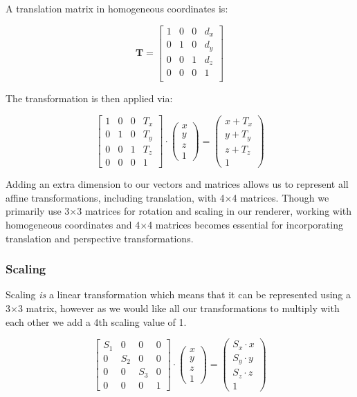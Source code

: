 \documentclass[12pt]{article}
\begin{document}
A translation matrix in homogeneous coordinates is:

\[
    \mathbf{T} = \begin{bmatrix}
        1 & 0 & 0 & d_x \\
        0 & 1 & 0 & d_y \\
        0 & 0 & 1 & d_z \\
        0 & 0 & 0 & 1   \\
    \end{bmatrix}
\]

The transformation is then applied via:

\[
    \begin{bmatrix}  1 & 0 & 0 & {T_x} \\ 0 & 1 & 0 & {T_y} \\ 0 & 0 & 1 & {T_z} \\ 0 & 0 & 0 & 1 \end{bmatrix} \cdot \begin{pmatrix} x \\ y \\ z \\ 1 \end{pmatrix} = \begin{pmatrix} x + {T_x} \\ y + {T_y} \\ z + {T_z} \\ 1 \end{pmatrix}
\]

Adding an extra dimension to our vectors and matrices allows us to represent all affine transformations, including translation, with 4$\times$4 matrices. Though we primarily use 3$\times$3 matrices for rotation and scaling in our renderer, working with homogeneous coordinates and 4$\times$4 matrices becomes essential for incorporating translation and perspective transformations.


\subsubsection{Scaling}

Scaling \textit{is} a linear transformation which means that it can be represented using a 3$\times$3 matrix, however as we would like all our transformations to multiply with each other we add a 4th scaling value of 1.

\[
    \begin{bmatrix}
        {S_1} & 0     & 0     & 0 \\
        0     & {S_2} & 0     & 0 \\
        0     & 0     & {S_3} & 0 \\
        0     & 0     & 0     & 1
    \end{bmatrix} \cdot
    \begin{pmatrix} x \\ y \\ z \\ 1 \end{pmatrix} =
    \begin{pmatrix} {S_x} \cdot x \\ {S_y} \cdot y \\ {S_z} \cdot z \\ 1 \end{pmatrix}
\]
\end{document}
